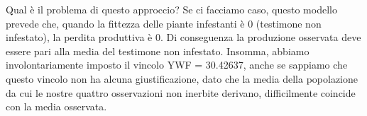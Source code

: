\documentclass[a4paper,12pt,oneside]{book}
\newenvironment{Shaded}{\begin{snugshade}}{\end{snugshade}}
\newcommand{\DecValTok}[1]{#1}
\newcommand{\FloatTok}[1]{#1}
\newcommand{\SpecialCharTok}[1]{#1}
\newcommand{\DocumentationTok}[1]{#1}
\newcommand{\OtherTok}[1]{#1}
\newcommand{\FunctionTok}[1]{#1}
\newcommand{\AttributeTok}[1]{#1}
\newcommand{\NormalTok}[1]{#1}
\begin{document}
\begin{Shaded}
\end{Shaded}

Qual è il problema di questo approccio? Se ci facciamo caso, questo modello prevede che, quando la fittezza delle piante infestanti è 0 (testimone non infestato), la perdita produttiva è 0. Di conseguenza la produzione osservata deve essere pari alla media del testimone non infestato. Insomma, abbiamo involontariamente imposto il vincolo YWF = 30.42637, anche se sappiamo che questo vincolo non ha alcuna giustificazione, dato che la media della popolazione da cui le nostre quattro osservazioni non inerbite derivano, difficilmente coincide con la media osservata.
\end{document}
